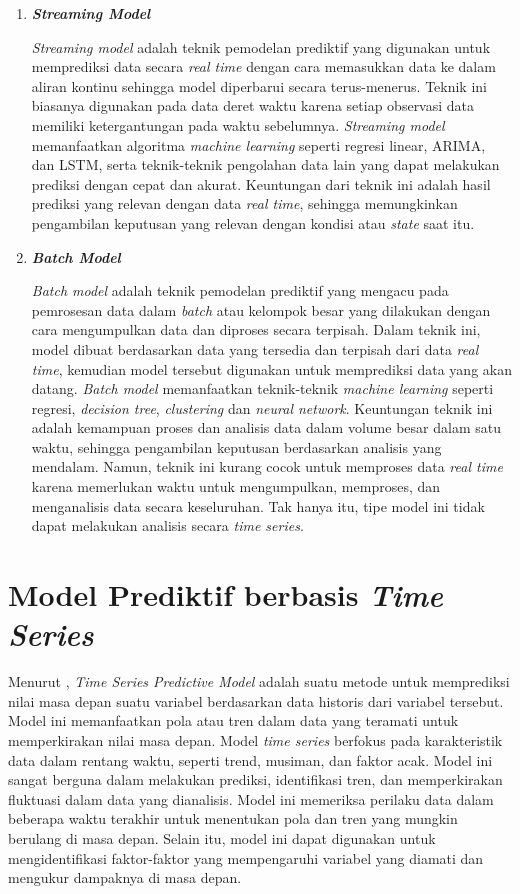 \begin{enumerate}
    \item \textbf{\textit{Streaming Model}}
    
    \textit{Streaming model} adalah teknik pemodelan prediktif yang digunakan untuk memprediksi data secara \textit{real time} dengan cara memasukkan data ke dalam aliran kontinu sehingga model diperbarui secara terus-menerus. Teknik ini biasanya digunakan pada data deret waktu karena setiap observasi data memiliki ketergantungan pada waktu sebelumnya. \textit{Streaming model} memanfaatkan algoritma \textit{machine learning} seperti regresi linear, ARIMA, dan LSTM, serta teknik-teknik pengolahan data lain yang dapat melakukan prediksi dengan cepat dan akurat. Keuntungan dari teknik ini adalah hasil prediksi yang relevan dengan data \textit{real time}, sehingga memungkinkan pengambilan keputusan yang relevan dengan kondisi atau \textit{state} saat itu.

    \item \textbf{\textit{Batch Model}}
    
    \textit{Batch model} adalah teknik pemodelan prediktif yang mengacu pada pemrosesan data dalam \textit{batch} atau kelompok besar yang dilakukan dengan cara mengumpulkan data dan diproses secara terpisah. Dalam teknik ini, model dibuat berdasarkan data yang tersedia dan terpisah dari data \textit{real time}, kemudian model tersebut digunakan untuk memprediksi data yang akan datang. \textit{Batch model} memanfaatkan teknik-teknik \textit{machine learning} seperti regresi, \textit{decision tree}, \textit{clustering} dan \textit{neural network}. Keuntungan teknik ini adalah kemampuan proses dan analisis data dalam volume besar dalam satu waktu, sehingga pengambilan keputusan berdasarkan analisis yang mendalam. Namun, teknik ini kurang cocok untuk memproses data \textit{real time} karena memerlukan waktu untuk mengumpulkan, memproses, dan menganalisis data secara keseluruhan. Tak hanya itu, tipe model ini tidak dapat melakukan analisis secara \textit{time series}.
\end{enumerate}

\section{Model Prediktif berbasis \textit{Time Series}}
Menurut \parencite{timeseriesanalysis}, \textit{Time Series Predictive Model} adalah suatu metode untuk memprediksi nilai masa depan suatu variabel berdasarkan data historis dari variabel tersebut. Model ini memanfaatkan pola atau tren dalam data yang teramati untuk memperkirakan nilai masa depan. Model \textit{time series} berfokus pada karakteristik data dalam rentang waktu, seperti trend, musiman, dan faktor acak. Model ini sangat berguna dalam melakukan prediksi, identifikasi tren, dan memperkirakan fluktuasi dalam data yang dianalisis. Model ini memeriksa perilaku data dalam beberapa waktu terakhir untuk menentukan pola dan tren yang mungkin berulang di masa depan. Selain itu, model ini dapat digunakan untuk mengidentifikasi faktor-faktor yang mempengaruhi variabel yang diamati dan mengukur dampaknya di masa depan.

